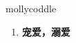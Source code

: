 
\begin{frame}
{\huge mollycoddle}
\begin{center}
\begin{enumerate}\Large
  \item \textbf{宠爱，溺爱}
\end{enumerate}
\end{center}
\end{frame}
